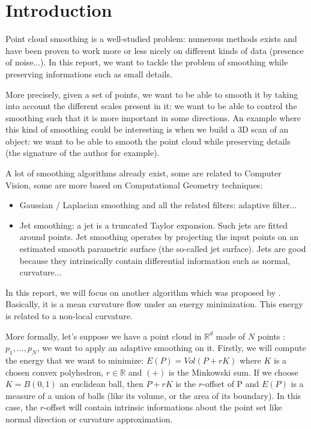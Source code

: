 \chapter{Introduction}


Point cloud smoothing is a well-studied problem: numerous methods exists and
have been proven to work more or less nicely on different kinds of data
(presence of noise...). In this report, we want to tackle the problem of
smoothing while preserving informations such as small details.

More precisely, given a set of points, we want to be able to smooth it by taking
into account the different scales present in it: we want to be able to control
the smoothing such that it is more important in some directions. An example
where this kind of smoothing could be interesting is when we build a 3D scan of
an object: we want to be able to smooth the point cloud while preserving details
(the signature of the author for example).

A lot of smoothing algorithms already exist, some are related to Computer
Vision, some are more based on Computational Geometry techniques:
\begin{itemize}
    \item Gaussian / Laplacian smoothing and all the related filters: adaptive
        filter...
    \item Jet smoothing: a jet is a truncated Taylor expansion. Such jets are
        fitted around points. Jet smoothing operates by projecting the input
        points on an estimated smooth parametric surface (the so-called jet
        surface). Jets are good because they intrinsically contain
        differential information such as normal, curvature...
\end{itemize}

In this report, we will focus on another algorithm which was proposed by
\cite{chambolle2012nonlocal}. Basically, it is a mean curvature flow under an
energy minimization. This energy is related to a non-local curvature.

More formally, let's suppose we have a point cloud in $ \mathbb{R}^d $ made of $
N $ points : $ p_1, \ldots, p_N $, we want to apply an adaptive smoothing on it.
Firstly, we will compute the energy that we want to minimize: $ E(P) = Vol(P + r
K) $ where $ K $ is a chosen convex polyhedron, $ r \in \mathbb{R} $ and $ (+) $
is the Minkowski sum. If we choose $ K = B(0, 1) $ an euclidean ball, then $ P +
rK $ is the $ r $-offset of P and $ E(P) $ is a measure of a union of balls
(like its volume, or the area of its boundary). In this case, the $ r $-offset
will contain intrinsic informations about the point set like normal direction or
curvature approximation.


